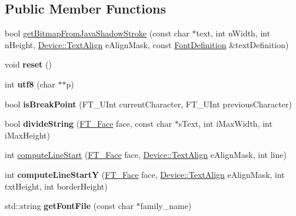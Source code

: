 \subsection*{Public Member Functions}
\begin{DoxyCompactItemize}
\item 
bool \hyperlink{classBitmapDC_a734c131882b3607827c9685807943019}{get\+Bitmap\+From\+Java\+Shadow\+Stroke} (const char $\ast$text, int n\+Width, int n\+Height, \hyperlink{classDevice_a62f8577d4803c8fce764f7cdff2abe92}{Device\+::\+Text\+Align} e\+Align\+Mask, const \hyperlink{structFontDefinition}{Font\+Definition} \&text\+Definition)
\item 
\mbox{\label{classBitmapDC_a629c7012b6ab67b16140922c121b333d}} 
void {\bfseries reset} ()
\item 
\mbox{\label{classBitmapDC_a3ae2c8d490f8331d4b53642905e93875}} 
int {\bfseries utf8} (char $\ast$$\ast$p)
\item 
\mbox{\label{classBitmapDC_a46232dd4607e9be944a0467795db8f8a}} 
bool {\bfseries is\+Break\+Point} (F\+T\+\_\+\+U\+Int current\+Character, F\+T\+\_\+\+U\+Int previous\+Character)
\item 
\mbox{\label{classBitmapDC_add8bd34fc22d6556407efa21809599d7}} 
bool {\bfseries divide\+String} (\hyperlink{structFT__FaceRec__}{F\+T\+\_\+\+Face} face, const char $\ast$s\+Text, int i\+Max\+Width, int i\+Max\+Height)
\item 
int \hyperlink{classBitmapDC_a328c33eb275ee20b6730ffccbaf989cd}{compute\+Line\+Start} (\hyperlink{structFT__FaceRec__}{F\+T\+\_\+\+Face} face, \hyperlink{classDevice_a62f8577d4803c8fce764f7cdff2abe92}{Device\+::\+Text\+Align} e\+Align\+Mask, int line)
\item 
\mbox{\label{classBitmapDC_a6012c3309d6ae2cdad790cc1f8f191e9}} 
int {\bfseries compute\+Line\+StartY} (\hyperlink{structFT__FaceRec__}{F\+T\+\_\+\+Face} face, \hyperlink{classDevice_a62f8577d4803c8fce764f7cdff2abe92}{Device\+::\+Text\+Align} e\+Align\+Mask, int txt\+Height, int border\+Height)
\item 
\mbox{\label{classBitmapDC_a705bb5929b02018f55de364ca7c976a9}} 
std\+::string {\bfseries get\+Font\+File} (const char $\ast$family\+\_\+name)
$$
\end{DoxyCompactItemize}
